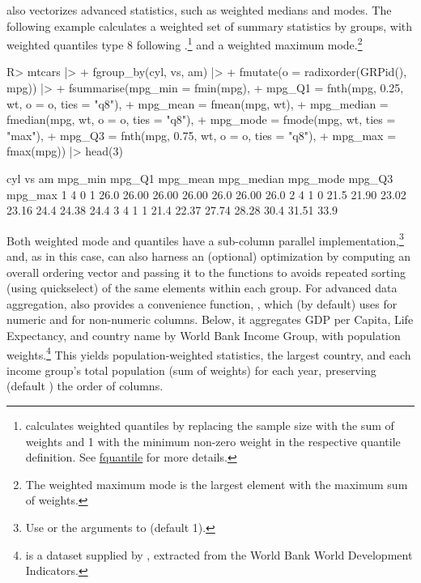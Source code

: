 \documentclass[article]{jss}
\newcommand{\fct}[1]{\code{#1()}}
\begin{document}
 also vectorizes advanced statistics, such as weighted medians and modes. The following example calculates a weighted set of summary statistics by groups, with weighted quantiles type 8 following \citet{hyndman1996sample}.\footnote{ calculates weighted quantiles by replacing the sample size with the sum of weights and 1 with the minimum non-zero weight in the respective quantile definition. See \href{https://sebkrantz.github.io/collapse/reference/fquantile.html}{fquantile} for more details.} and a weighted maximum mode.\footnote{The weighted maximum mode is the largest element with the maximum sum of weights.}
%
\begin{Schunk}
\begin{Sinput}
R> mtcars |>
+      fgroup_by(cyl, vs, am) |>
+      fmutate(o = radixorder(GRPid(), mpg)) |>
+      fsummarise(mpg_min = fmin(mpg),
+                 mpg_Q1 = fnth(mpg, 0.25, wt, o = o, ties = "q8"),
+                 mpg_mean = fmean(mpg, wt),
+                 mpg_median = fmedian(mpg, wt, o = o, ties = "q8"),
+                 mpg_mode = fmode(mpg, wt, ties = "max"),
+                 mpg_Q3 = fnth(mpg, 0.75, wt, o = o, ties = "q8"),
+                 mpg_max = fmax(mpg)) |> head(3)
\end{Sinput}
\begin{Soutput}
  cyl vs am mpg_min mpg_Q1 mpg_mean mpg_median mpg_mode mpg_Q3 mpg_max
1   4  0  1    26.0  26.00    26.00      26.00     26.0  26.00    26.0
2   4  1  0    21.5  21.90    23.02      23.16     24.4  24.38    24.4
3   4  1  1    21.4  22.37    27.74      28.28     30.4  31.51    33.9
\end{Soutput}
\end{Schunk}
%
Both weighted mode and quantiles have a sub-column parallel implementation,\footnote{Use  or the  arguments to  (default 1).} and, as in this case, can also harness an (optional) optimization by computing an overall ordering vector and passing it to the functions to avoids repeated sorting (using quickselect) of the same elements within each group. For advanced data aggregation,  also provides a convenience function, \fct{collap}, which (by default) uses  for numeric and  for non-numeric columns. Below, it aggregates GDP per Capita, Life Expectancy, and country name by World Bank Income Group, with population weights.\footnote{\href{https://sebkrantz.github.io/collapse/reference/wlddev.html}{} is a dataset supplied by , extracted from the World Bank World Development Indicators.} This yields population-weighted statistics, the largest country, and each income group's total population (sum of weights) for each year, preserving (default ) the order of columns.
\end{document}
